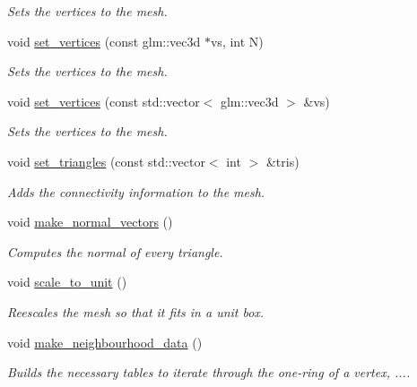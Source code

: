\begin{DoxyCompactItemize}
\begin{DoxyCompactList}\small\item\em Sets the vertices to the mesh. \end{DoxyCompactList}\item 
void \hyperlink{classgeoproc_1_1TriangleMesh_a6a22ba5b1e8dcf735c104fa03b01f7ae}{set\+\_\+vertices} (const glm\+::vec3d $\ast$vs, int N)
\begin{DoxyCompactList}\small\item\em Sets the vertices to the mesh. \end{DoxyCompactList}\item 
void \hyperlink{classgeoproc_1_1TriangleMesh_a8ec1bd0a9ff539251ee3750eedc694b3}{set\+\_\+vertices} (const std\+::vector$<$ glm\+::vec3d $>$ \&vs)
\begin{DoxyCompactList}\small\item\em Sets the vertices to the mesh. \end{DoxyCompactList}\item 
void \hyperlink{classgeoproc_1_1TriangleMesh_a5e35cad5c18195e6397f22bc951161f1}{set\+\_\+triangles} (const std\+::vector$<$ int $>$ \&tris)
\begin{DoxyCompactList}\small\item\em Adds the connectivity information to the mesh. \end{DoxyCompactList}\item 
void \hyperlink{classgeoproc_1_1TriangleMesh_a638f0267d7d8e51498330e414fa25bfe}{make\+\_\+normal\+\_\+vectors} ()
\begin{DoxyCompactList}\small\item\em Computes the normal of every triangle. \end{DoxyCompactList}\item 
void \hyperlink{classgeoproc_1_1TriangleMesh_a2b34ddfa21f906805451e6dbbb4ce064}{scale\+\_\+to\+\_\+unit} ()
\begin{DoxyCompactList}\small\item\em Reescales the mesh so that it fits in a unit box. \end{DoxyCompactList}\item 
void \hyperlink{classgeoproc_1_1TriangleMesh_a84003dfdfd5e591c00f01a797578ff1f}{make\+\_\+neighbourhood\+\_\+data} ()
\begin{DoxyCompactList}\small\item\em Builds the necessary tables to iterate through the one-\/ring of a vertex, .... \end{DoxyCompactList}\item 

\end{DoxyCompactItemize}
